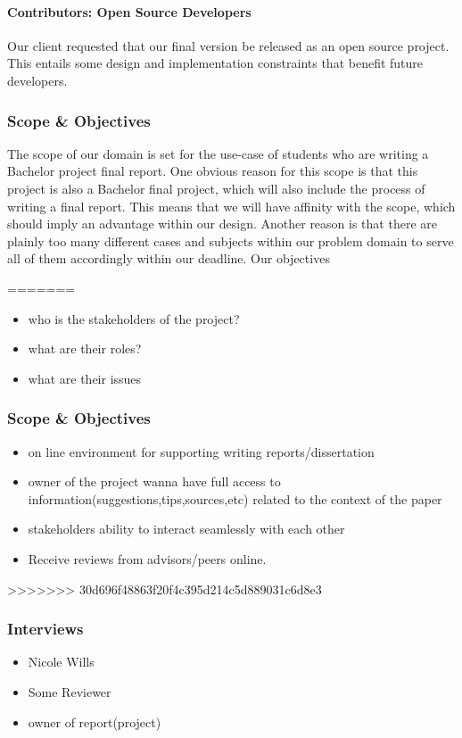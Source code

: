 \paragraph{Contributors: Open Source Developers} Our client requested that our final version be released as an open source project. This entails some design and implementation constraints that benefit future developers.

\subsubsection{Scope \& Objectives}

The scope of our domain is set for the use-case of students who are writing a Bachelor project final report. One obvious reason for this scope is that this project is also a Bachelor final project, which will also include the process of writing a final report. This means that we will have affinity with the scope, which should imply an advantage within our design. Another reason is that there are plainly too many different cases and subjects within our problem domain to serve all of them accordingly within our deadline.
Our objectives 

=======
\begin{itemize}
	\item who is the stakeholders of the project?
	\item what are their roles?
	\item what are their issues
\end{itemize}
\subsubsection{Scope \& Objectives}
\begin{itemize}
	\item on line environment for supporting writing reports/dissertation
	\item owner of the project wanna have full access to information(suggestions,tips,sources,etc) related to the context of the paper
	\item stakeholders ability to interact seamlessly with each other
	\item Receive reviews from advisors/peers online.
\end{itemize}
>>>>>>> 30d696f48863f20f4c395d214c5d889031c6d8e3
\subsubsection{Interviews} %
\begin{itemize}
	\item Nicole Wills
	\item Some Reviewer
	\item owner of report(project)
\end{itemize}


